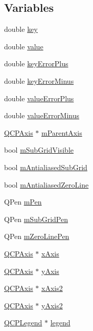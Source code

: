 \subsection*{Variables}
\begin{DoxyCompactItemize}
\item 
double \hyperlink{a00116_a94bb892c30911cd62cba0707a5395be4}{key}
\item 
double \hyperlink{a00116_aee90379adb0307effb138f4871edbc5c}{value}
\item 
double \hyperlink{a00116_a1d47938cd7209297ef861cf01816d89f}{key\+Error\+Plus}
\item 
double \hyperlink{a00116_a7d90a6258f6d24ad254245076e5beac7}{key\+Error\+Minus}
\item 
double \hyperlink{a00116_a6d93a38079a2b52118982e82673e87a3}{value\+Error\+Plus}
\item 
double \hyperlink{a00116_aea31bce613e569fc5e1888465c677909}{value\+Error\+Minus}
\item 
\hyperlink{a00025}{Q\+C\+P\+Axis} $\ast$ \hyperlink{a00116_aea80007cf54320e192a69054cd81504b}{m\+Parent\+Axis}
\item 
bool \hyperlink{a00116_a117dd29d26688e4651a5aae265e1f1b9}{m\+Sub\+Grid\+Visible}
\item 
bool \hyperlink{a00116_af55685e73eae391bbdfd4b2eec8484af}{m\+Antialiased\+Sub\+Grid}
\item 
bool \hyperlink{a00116_a52a4de0f44b2192ad7b97ce66e265649}{m\+Antialiased\+Zero\+Line}
\item 
Q\+Pen \hyperlink{a00116_abcb7df1a54826856cb8f0e0ef696873b}{m\+Pen}
\item 
Q\+Pen \hyperlink{a00116_af21f3a7972c59242965129b985f53556}{m\+Sub\+Grid\+Pen}
\item 
Q\+Pen \hyperlink{a00116_ad8f3f742873da937274c85359dc03f7e}{m\+Zero\+Line\+Pen}
\item 
\hyperlink{a00025}{Q\+C\+P\+Axis} $\ast$ \hyperlink{a00116_a384438707adbcc96b0fa1324106f7129}{x\+Axis}
\item 
\hyperlink{a00025}{Q\+C\+P\+Axis} $\ast$ \hyperlink{a00116_af168096ce67002b1fbce18ae5dd1b652}{y\+Axis}
\item 
\hyperlink{a00025}{Q\+C\+P\+Axis} $\ast$ \hyperlink{a00116_a058f6d3a4c86bf94c476e5c380711dba}{x\+Axis2}
\item 
\hyperlink{a00025}{Q\+C\+P\+Axis} $\ast$ \hyperlink{a00116_a4fd6679232da7da0a1ae4e1b6ae83d6e}{y\+Axis2}
\item 
\hyperlink{a00045}{Q\+C\+P\+Legend} $\ast$ \hyperlink{a00116_a75acd427ec48e9a9d2ae6a17817cc490}{legend}

\end{DoxyCompactItemize}
